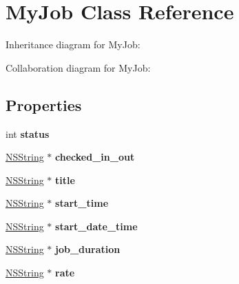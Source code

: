 \hypertarget{interface_my_job}{
\section{\-My\-Job \-Class \-Reference}
\label{interface_my_job}
}


\-Inheritance diagram for \-My\-Job\-:


\-Collaboration diagram for \-My\-Job\-:
\subsection*{\-Properties}
\begin{DoxyCompactItemize}
\item 
\hypertarget{interface_my_job_a8f8786012e71383a033fb1560550b11f}{
int {\bfseries status}}
\label{interface_my_job_a8f8786012e71383a033fb1560550b11f}

\item 
\hypertarget{interface_my_job_a44790cb587bf58ccb6cc78adc74d0678}{
\hyperlink{class_n_s_string}{\-N\-S\-String} $\ast$ {\bfseries checked\-\_\-in\-\_\-out}}
\label{interface_my_job_a44790cb587bf58ccb6cc78adc74d0678}

\item 
\hypertarget{interface_my_job_a9a345d8889fdb627244ca69b1f86c7ba}{
\hyperlink{class_n_s_string}{\-N\-S\-String} $\ast$ {\bfseries title}}
\label{interface_my_job_a9a345d8889fdb627244ca69b1f86c7ba}

\item 
\hypertarget{interface_my_job_a136a0aca8f684c07b23029112844f452}{
\hyperlink{class_n_s_string}{\-N\-S\-String} $\ast$ {\bfseries start\-\_\-time}}
\label{interface_my_job_a136a0aca8f684c07b23029112844f452}

\item 
\hypertarget{interface_my_job_a7aca505c8ca4751f5bb2388156791c81}{
\hyperlink{class_n_s_string}{\-N\-S\-String} $\ast$ {\bfseries start\-\_\-date\-\_\-time}}
\label{interface_my_job_a7aca505c8ca4751f5bb2388156791c81}

\item 
\hypertarget{interface_my_job_ad2afffc4da4509058fd8aeb9abb50e9e}{
\hyperlink{class_n_s_string}{\-N\-S\-String} $\ast$ {\bfseries job\-\_\-duration}}
\label{interface_my_job_ad2afffc4da4509058fd8aeb9abb50e9e}

\item 
\hypertarget{interface_my_job_a0fb8200a10e625696297e311ddd4b8b1}{
\hyperlink{class_n_s_string}{\-N\-S\-String} $\ast$ {\bfseries rate}}
\label{interface_my_job_a0fb8200a10e625696297e311ddd4b8b1}


\end{DoxyCompactItemize}
